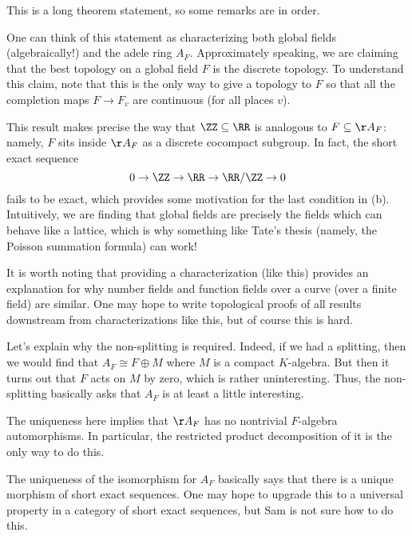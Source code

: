 \documentclass{article}
\begin{document}
This is a long theorem statement, so some remarks are in order.
\begin{remark}
	One can think of this statement as characterizing both global fields (algebraically!) and the adele ring $A_F$. Approximately speaking, we are claiming that the best topology on a global field $F$ is the discrete topology. To understand this claim, note that this is the only way to give a topology to $F$ so that all the completion maps $F\to F_v$ are continuous (for all places $v$).
\end{remark}
\begin{remark}
	This result makes precise the way that $\ZZ\subseteq\RR$ is analogous to $F\subseteq\AA_F$: namely, $F$ sits inside $\AA_F$ as a discrete cocompact subgroup. In fact, the short exact sequence
	\[0\to\ZZ\to\RR\to\RR/\ZZ\to0\]
	fails to be exact, which provides some motivation for the last condition in (b). Intuitively, we are finding that global fields are precisely the fields which can behave like a lattice, which is why something like Tate's thesis (namely, the Poisson summation formula) can work!
\end{remark}
\begin{remark}
	It is worth noting that providing a characterization (like this) provides an explanation for why number fields and function fields over a curve (over a finite field) are similar. One may hope to write topological proofs of all results downstream from characterizations like this, but of course this is hard.
\end{remark}
\begin{remark}
	Let's explain why the non-splitting is required. Indeed, if we had a splitting, then we would find that $A_F\cong F\oplus M$ where $M$ is a compact $K$-algebra. But then it turns out that $F$ acts on $M$ by zero, which is rather uninteresting. Thus, the non-splitting basically asks that $A_F$ is at least a little interesting.
\end{remark}
\begin{remark}
	The uniqueness here implies that $\AA_F$ has no nontrivial $F$-algebra automorphisms. In particular, the restricted product decomposition of it is the only way to do this.
\end{remark}
\begin{remark}
	The uniqueness of the isomorphism for $A_F$ basically says that there is a unique morphism of short exact sequences. One may hope to upgrade this to a universal property in a category of short exact sequences, but Sam is not sure how to do this.
\end{remark}
\end{document}
